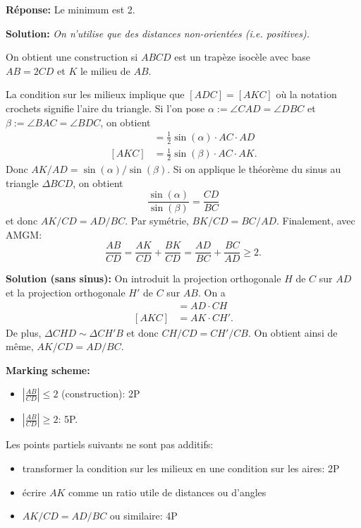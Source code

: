 \documentclass[language=german,style=solution]{smo}
\begin{document}
\begin{enumerate}
\textbf{Réponse:} Le minimum est 2.

\textbf{Solution:}
\textit{On n'utilise que des distances non-orientées (i.e. positives).}

On obtient une construction si $ABCD$ est un trapèze isocèle avec base $AB=2CD$ et $K$ le milieu de $AB$.

La condition sur les milieux implique que $[ADC]=[AKC]$ où la notation crochets signifie l'aire du triangle. Si l'on pose $\alpha:=\angle CAD=\angle DBC$ et $\beta:=\angle BAC=\angle BDC$, on obtient
\begin{align*}
[ADC]&=\frac{1}{2}\sin (\alpha)\cdot AC\cdot AD\\
[AKC]&=\frac{1}{2}\sin (\beta)\cdot AC\cdot AK.
\end{align*}
Donc $AK/AD=\sin (\alpha)/\sin (\beta)$. Si on applique le théorème du sinus au triangle $\Delta BCD$, on obtient
\[
\frac{\sin (\alpha)}{\sin (\beta)}=\frac{CD}{BC}
\]
et donc $AK/CD=AD/BC$. Par symétrie, $BK/CD=BC/AD$. Finalement, avec AMGM:
\[
\frac{AB}{CD}=\frac{AK}{CD}+\frac{BK}{CD}=\frac{AD}{BC}+\frac{BC}{AD}\geq 2.
\]

\textbf{Solution (sans sinus):}
On introduit la projection orthogonale $H$ de $C$ sur $AD$ et la projection orthogonale $H'$ de $C$ sur $AB$. On a 
\begin{align*}
[ADC]&=AD\cdot CH\\
[AKC]&=AK\cdot CH'.
\end{align*}
De plus, $\Delta CHD\sim\Delta CH'B$ et donc $CH/CD=CH'/CB$. On obtient ainsi de même, $AK/CD=AD/BC$.




\textbf{Marking scheme:}
\begin{itemize}
\item $\left| \frac{AB}{CD}\right|\leq 2$ (construction): 2P
\item $\left| \frac{AB}{CD}\right|\geq 2$: 5P. 
\end{itemize}

Les points partiels suivants ne sont pas additifs:
\begin{itemize}
\item transformer la condition sur les milieux en une condition sur les aires: 2P
\item écrire $AK$ comme un ratio utile de distances ou d'angles
\item $AK/CD=AD/BC$ ou similaire: 4P
\end{itemize}




\end{enumerate}
\end{document}
